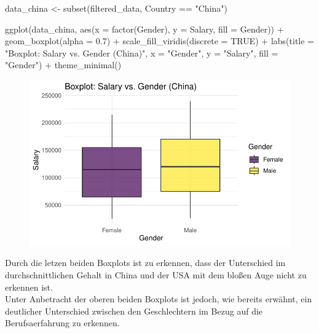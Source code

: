 \documentclass[
  letterpaper,
  DIV=11,
  numbers=noendperiod]{scrartcl}
\newenvironment{Shaded}{\begin{snugshade}}{\end{snugshade}}
\newcommand{\AttributeTok}[1]{\textcolor[rgb]{0.40,0.45,0.13}{#1}}
\newcommand{\ConstantTok}[1]{\textcolor[rgb]{0.56,0.35,0.01}{#1}}
\newcommand{\FloatTok}[1]{\textcolor[rgb]{0.68,0.00,0.00}{#1}}
\newcommand{\FunctionTok}[1]{\textcolor[rgb]{0.28,0.35,0.67}{#1}}
\newcommand{\NormalTok}[1]{\textcolor[rgb]{0.00,0.23,0.31}{#1}}
\newcommand{\OtherTok}[1]{\textcolor[rgb]{0.00,0.23,0.31}{#1}}
\newcommand{\SpecialCharTok}[1]{\textcolor[rgb]{0.37,0.37,0.37}{#1}}
\newcommand{\StringTok}[1]{\textcolor[rgb]{0.13,0.47,0.30}{#1}}
\begin{document}
\begin{Shaded}
\begin{Highlighting}[]
\NormalTok{data\_china }\OtherTok{\textless{}{-}} \FunctionTok{subset}\NormalTok{(filtered\_data, Country }\SpecialCharTok{==} \StringTok{"China"}\NormalTok{)}

\FunctionTok{ggplot}\NormalTok{(data\_china, }\FunctionTok{aes}\NormalTok{(}\AttributeTok{x =} \FunctionTok{factor}\NormalTok{(Gender), }\AttributeTok{y =}\NormalTok{ Salary, }\AttributeTok{fill =}\NormalTok{ Gender)) }\SpecialCharTok{+}
  \FunctionTok{geom\_boxplot}\NormalTok{(}\AttributeTok{alpha =} \FloatTok{0.7}\NormalTok{) }\SpecialCharTok{+}
  \FunctionTok{scale\_fill\_viridis}\NormalTok{(}\AttributeTok{discrete =} \ConstantTok{TRUE}\NormalTok{) }\SpecialCharTok{+}
  \FunctionTok{labs}\NormalTok{(}\AttributeTok{title =} \StringTok{"Boxplot: Salary vs. Gender (China)"}\NormalTok{,}
       \AttributeTok{x =} \StringTok{"Gender"}\NormalTok{,}
       \AttributeTok{y =} \StringTok{"Salary"}\NormalTok{,}
       \AttributeTok{fill =} \StringTok{"Gender"}\NormalTok{) }\SpecialCharTok{+}
  \FunctionTok{theme\_minimal}\NormalTok{()}
\end{Highlighting}
\end{Shaded}

\begin{figure}[H]

{\centering \includegraphics{main_doc_files/figure-pdf/unnamed-chunk-70-1.pdf}

}

\end{figure}

Durch die letzen beiden Boxplots ist zu erkennen, dass der Unterschied
im durchschnittlichen Gehalt in China und der USA mit dem bloßen Auge
nicht zu erkennen ist.\\
Unter Anbetracht der oberen beiden Boxplots ist jedoch, wie bereits
erwähnt, ein deutlicher Unterschied zwischen den Geschlechtern im Bezug
auf die Berufsaerfahrung zu erkennen.
\end{document}
